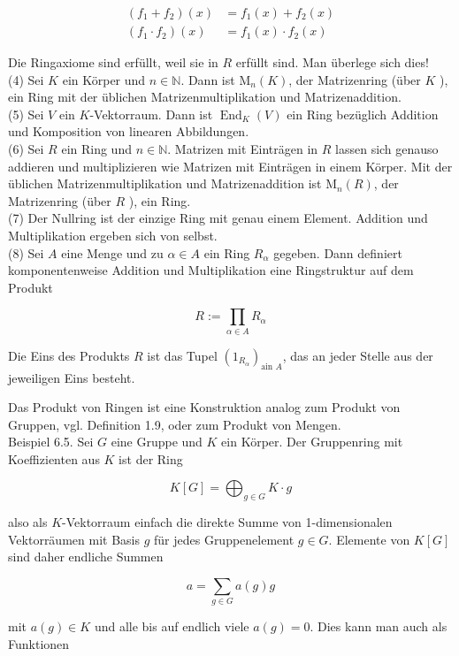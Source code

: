 \documentclass[10pt, letterpaper]{article}
\begin{document}
$$
\begin{aligned}
\left(f_{1}+f_{2}\right)(x) & =f_{1}(x)+f_{2}(x) \\
\left(f_{1} \cdot f_{2}\right)(x) & =f_{1}(x) \cdot f_{2}(x)
\end{aligned}
$$

Die Ringaxiome sind erfüllt, weil sie in $R$ erfüllt sind. Man überlege sich dies!\\
(4) Sei $K$ ein Körper und $n \in \mathbb{N}$. Dann ist $\mathrm{M}_{n}(K)$, der Matrizenring (über $K$ ), ein Ring mit der üblichen Matrizenmultiplikation und Matrizenaddition.\\
(5) Sei $V$ ein $K$-Vektorraum. Dann ist $\operatorname{End}_{K}(V)$ ein Ring bezüglich Addition und Komposition von linearen Abbildungen.\\
(6) Sei $R$ ein Ring und $n \in \mathbb{N}$. Matrizen mit Einträgen in $R$ lassen sich genauso addieren und multiplizieren wie Matrizen mit Einträgen in einem Körper. Mit der üblichen Matrizenmultiplikation und Matrizenaddition ist $\mathrm{M}_{n}(R)$, der Matrizenring (über $R$ ), ein Ring.\\
(7) Der Nullring ist der einzige Ring mit genau einem Element. Addition und Multiplikation ergeben sich von selbst.\\
(8) Sei $A$ eine Menge und zu $\alpha \in A$ ein Ring $R_{\alpha}$ gegeben. Dann definiert komponentenweise Addition und Multiplikation eine Ringstruktur auf dem Produkt

$$
R:=\prod_{\alpha \in A} R_{\alpha}
$$

Die Eins des Produkts $R$ ist das Tupel $\left(1_{R_{\alpha}}\right)_{\text {ain } A}$, das an jeder Stelle aus der jeweiligen Eins besteht.

Das Produkt von Ringen ist eine Konstruktion analog zum Produkt von Gruppen, vgl. Definition 1.9, oder zum Produkt von Mengen.\\
Beispiel 6.5. Sei $G$ eine Gruppe und $K$ ein Körper. Der Gruppenring mit Koeffizienten aus $K$ ist der Ring

$$
K[G]=\bigoplus_{g \in G} K \cdot g
$$

also als $K$-Vektorraum einfach die direkte Summe von 1-dimensionalen Vektorräumen mit Basis $g$ für jedes Gruppenelement $g \in G$. Elemente von $K[G]$ sind daher endliche Summen

$$
a=\sum_{g \in G} a(g) g
$$

mit $a(g) \in K$ und alle bis auf endlich viele $a(g)=0$. Dies kann man auch als Funktionen
\end{document}
